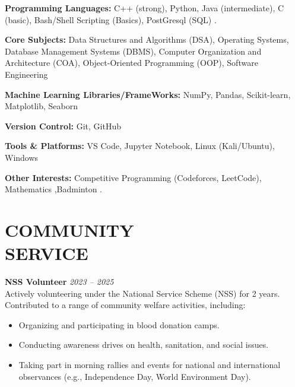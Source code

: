 \documentclass[margin, 10pt]{res} %
\begin{document}
\begin{resume}
\textbf{Programming Languages:} C++ (strong), Python, Java (intermediate), C (basic), Bash/Shell Scripting (Basics), PostGresql (SQL) .
 
\textbf{Core Subjects:} Data Structures and Algorithms (DSA), Operating Systems, Database Management Systems (DBMS), Computer Organization and Architecture (COA), Object-Oriented Programming (OOP), Software Engineering

\textbf{Machine Learning Libraries/FrameWorks:} NumPy, Pandas, Scikit-learn, Matplotlib, Seaborn    

\textbf{Version Control:} Git, GitHub

\textbf{Tools \& Platforms:} VS Code, Jupyter Notebook, Linux (Kali/Ubuntu), Windows

\textbf{Other Interests:} Competitive Programming (Codeforces, LeetCode), Mathematics ,Badminton .



\section{COMMUNITY \\ SERVICE}

\textbf{NSS Volunteer} \hfill \textit{2023 – 2025} \\
Actively volunteering under the National Service Scheme (NSS) for 2 years. Contributed to a range of community welfare activities, including:
\begin{itemize}
    \item Organizing and participating in blood donation camps.
    \item Conducting awareness drives on health, sanitation, and social issues.
    \item Taking part in morning rallies and events for national and international observances (e.g., Independence Day, World Environment Day).
\end{itemize}




\end{resume}
\end{document}
